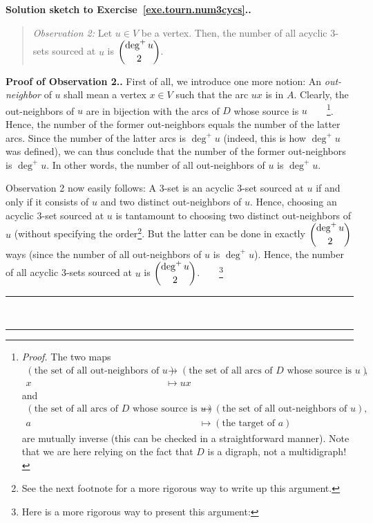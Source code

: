 \documentclass[numbers=enddot,12pt,final,onecolumn,notitlepage]{scrartcl}%
\theoremstyle{definition}
\newenvironment{statement}{\begin{quote}}{\end{quote}}
\newenvironment{proof}[1][Proof]{\noindent\textbf{#1.} }{\ \rule{0.5em}{0.5em}}
\newcommand{\tup}[1]{\left( #1 \right)}
\begin{document}
\begin{proof}[Solution sketch to Exercise~\ref{exe.tourn.num3cycs}.]
\begin{statement}
\textit{Observation 2:} Let $u \in V$ be a vertex. Then, the number
of all acyclic 3-sets sourced at $u$ is $\dbinom{\deg^+ u}{2}$.
\end{statement}
\begin{proof}[Proof of Observation 2.]
First of all, we introduce one more notion:
An \textit{out-neighbor} of $u$ shall mean a vertex $x \in V$
such that the arc $ux$ is in $A$.
Clearly, the out-neighbors of $u$ are in bijection with the arcs of
$D$ whose source is $u$\ \ \ \ \footnote{\textit{Proof.} The two maps
\begin{align*}
\tup{\text{the set of all out-neighbors of } u}
&\to
\tup{\text{the set of all arcs of } D \text{ whose source is } u}, \\
x &\mapsto ux
\end{align*}
and
\begin{align*}
\tup{\text{the set of all arcs of } D \text{ whose source is } u}
&\to
\tup{\text{the set of all out-neighbors of } u}, \\
a &\mapsto \tup{\text{the target of } a}
\end{align*}
are mutually inverse (this can be checked in a straightforward
manner). Note that we are here relying on the fact that $D$ is a
digraph, not a multidigraph!}. Hence, the number of the former
out-neighbors equals the number of the latter arcs.
Since the number of the latter arcs
is $\deg^+ u$ (indeed, this is how $\deg^+ u$ was defined), we can
thus conclude that the number of the former out-neighbors is
$\deg^+ u$. In other words, the number of all out-neighbors of $u$
is $\deg^+ u$.

Observation 2 now easily follows: A 3-set is an acyclic 3-set sourced
at $u$ if and only if it consists of $u$ and two distinct
out-neighbors of $u$. Hence, choosing an acyclic 3-set sourced at $u$
is tantamount to choosing two distinct out-neighbors of $u$ (without
specifying the order\footnote{See the next footnote for a more
rigorous way to write up this argument.}.
But the latter can be done in exactly $\dbinom{\deg^+ u}{2}$
ways (since the number of all out-neighbors of $u$ is $\deg^+ u$).
Hence, the number of all acyclic 3-sets sourced at $u$ is
$\dbinom{\deg^+ u}{2}$.\ \ \ \ \footnote{Here is a more rigorous way
to present this argument:

}
\end{proof}
\end{proof}
\end{document}
